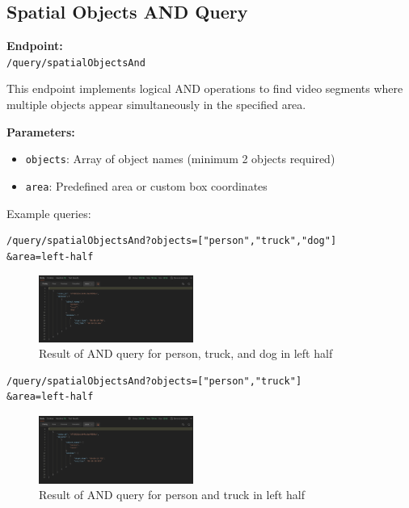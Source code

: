 \documentclass[conference]{IEEEtran}
\begin{document}
\subsection{Spatial Objects AND Query}
\textbf{Endpoint:} \\ 
\texttt{/query/spatialObjectsAnd}

This endpoint implements logical AND operations to find video segments where multiple objects appear simultaneously in the specified area.

\textbf{Parameters:}
\begin{itemize}
    \item \texttt{objects}: Array of object names (minimum 2 objects required)
    \item \texttt{area}: Predefined area or custom box coordinates
\end{itemize}

Example queries:\\
\begin{minipage}{\linewidth}
\scriptsize
\begin{verbatim}
/query/spatialObjectsAnd?objects=["person","truck","dog"]
&area=left-half
\end{verbatim}
\end{minipage}

\begin{figure}[H]
    \centering
    \includegraphics[width=0.45\textwidth]{3.jpeg}
    \caption{Result of AND query for person, truck, and dog in left half}
    \label{fig:query3}
\end{figure}

\begin{minipage}{\linewidth}
\scriptsize
\begin{verbatim}
/query/spatialObjectsAnd?objects=["person","truck"]
&area=left-half
\end{verbatim}
\end{minipage}

\begin{figure}[H]
    \centering
    \includegraphics[width=0.45\textwidth]{4.jpeg}
    \caption{Result of AND query for person and truck in left half}
    \label{fig:query4}
\end{figure}
\end{document}
